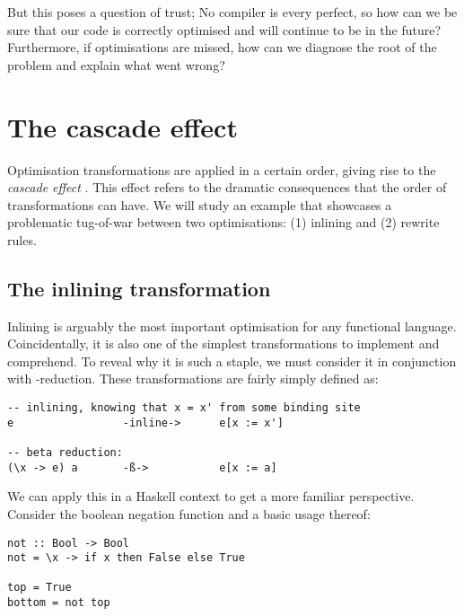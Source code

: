 But this poses a question of trust; No compiler is every perfect, so how can we be sure that our code is
correctly optimised and will continue to be in the future? Furthermore, if optimisations are missed, how
can we diagnose the root of the problem and explain what went wrong?

\section{The cascade effect}

Optimisation transformations are applied in a certain order, giving rise to the \textit{cascade effect} \cite{haskell_optimisations_1997}.
This effect refers to the dramatic consequences that the order of transformations can have. We will study an example that
showcases a problematic tug-of-war between two optimisations: (1) inlining and (2) rewrite rules.

\subsection{The inlining transformation}

Inlining is arguably the most important optimisation for any functional language. Coincidentally,
it is also one of the simplest transformations to implement and comprehend. To reveal
why it is such a staple, we must consider it in conjunction with \textbeta-reduction. 
These transformations are fairly simply defined as:

\begin{listing}[H]
\begin{verbatim}
-- inlining, knowing that x = x' from some binding site
e                 -inline->      e[x := x']

-- beta reduction:
(\x -> e) a       -ß->           e[x := a]
\end{verbatim}
\end{listing}

We can apply this in a Haskell context to get a more familiar perspective. 
Consider the boolean negation function  and a basic usage thereof:

\begin{listing}[H]
\begin{verbatim}
not :: Bool -> Bool
not = \x -> if x then False else True

top = True
bottom = not top
\end{verbatim}
\end{listing}

